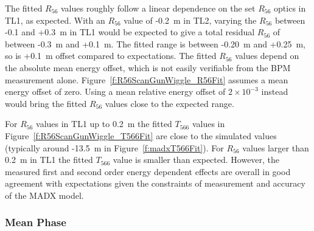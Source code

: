 The fitted \(R_{56}\) values roughly follow a linear dependence on the set \(R_{56}\) optics in TL1, as expected. With an \(R_{56}\) value of -0.2~m in TL2, varying the \(R_{56}\) between -0.1 and +0.3~m in TL1 would be expected to give a total residual \(R_{56}\) of between -0.3~m and +0.1~m. The fitted range is between -0.20~m and +0.25~m, so is +0.1~m offset compared to expectations. The fitted \(R_{56}\) values depend on the absolute mean energy offset, which is not easily verifiable from the BPM measurement alone. Figure~\ref{f:R56ScanGunWiggle_R56Fit} assumes a mean energy offset of zero. Using a mean relative energy offset of \(2\times10^{-3}\) instead would bring the fitted \(R_{56}\) values close to the expected range.

For \(R_{56}\) values in TL1 up to 0.2~m the fitted \(T_{566}\) values in Figure~\ref{f:R56ScanGunWiggle_T566Fit} are close to the simulated values (typically around -13.5~m in Figure~\ref{f:madxT566Fit}). For \(R_{56}\) values larger than 0.2~m in TL1 the fitted \(T_{566}\) value is smaller than expected. However, the measured first and second order energy dependent effects are overall in good agreement with expectations given the constraints of measurement and accuracy of the MADX model.


\subsubsection{Mean Phase}

